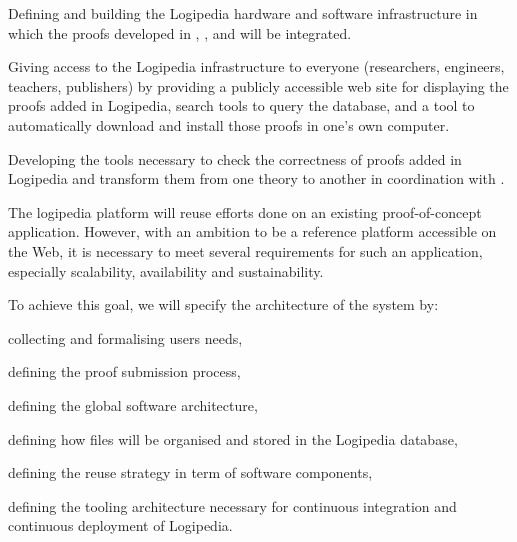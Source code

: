 \begin{workpackage}[id=access,type=RTD,wphases=1-48,
  short=Access,%
  title={Access},
  activity=tna,
  lead=Inr,InrRM=54,OcaRM=6]

\begin{wpobjectives}
  \begin{compactitem}
  \item Defining and building the Logipedia hardware and software
    infrastructure in which the proofs developed in
    , ,  and
     will be integrated.
  \item Giving access to the Logipedia infrastructure to everyone
    (researchers, engineers, teachers, publishers) by providing a
    publicly accessible web site for displaying the proofs added in
    Logipedia, search tools to query the database, and a tool to
    automatically download and install those proofs in one's own
    computer.
  \item Developing the tools necessary to check the correctness of proofs
    added in Logipedia and transform them from one theory to another
    in coordination with .
  \end{compactitem}
\end{wpobjectives}

\begin{tasklist}

  \begin{task}[id=archi,
      title=Setting up the hardware and software architecture,
      shorttitle=Archi.,
      lead=Inr,InrRM=6,wphases=1-6]
    The logipedia platform will reuse efforts done on an existing
    proof-of-concept application. However, with an ambition to be a
    reference platform accessible on the Web, it is necessary to meet
    several requirements for such an application, especially
    scalability, availability and sustainability.

    To achieve this goal, we will specify the architecture of the system by:
    \begin{compactitem}
    \item collecting and formalising users needs,
    \item defining the proof submission process,
    \item defining the global software architecture,
    \item defining how files will be organised and stored in the
      Logipedia database,
    \item defining the reuse strategy in term of software components,
    \item defining the tooling architecture necessary for continuous
      integration and continuous deployment of Logipedia.
    \end{compactitem}


\end{task}
\end{tasklist}
\end{workpackage}
